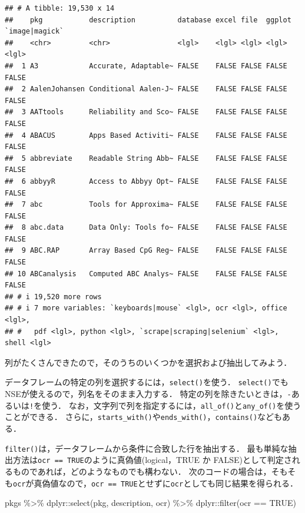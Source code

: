 \documentclass[
]{article}
\newenvironment{Shaded}{\begin{snugshade}}{\end{snugshade}}
\newcommand{\ConstantTok}[1]{\textcolor[rgb]{0.00,0.00,0.00}{#1}}
\newcommand{\FunctionTok}[1]{\textcolor[rgb]{0.00,0.00,0.00}{#1}}
\newcommand{\NormalTok}[1]{#1}
\newcommand{\SpecialCharTok}[1]{\textcolor[rgb]{0.00,0.00,0.00}{#1}}
\begin{document}
\begin{verbatim}
## # A tibble: 19,530 x 14
##    pkg           description          database excel file  ggplot `image|magick`
##    <chr>         <chr>                <lgl>    <lgl> <lgl> <lgl>  <lgl>         
##  1 A3            Accurate, Adaptable~ FALSE    FALSE FALSE FALSE  FALSE         
##  2 AalenJohansen Conditional Aalen-J~ FALSE    FALSE FALSE FALSE  FALSE         
##  3 AATtools      Reliability and Sco~ FALSE    FALSE FALSE FALSE  FALSE         
##  4 ABACUS        Apps Based Activiti~ FALSE    FALSE FALSE FALSE  FALSE         
##  5 abbreviate    Readable String Abb~ FALSE    FALSE FALSE FALSE  FALSE         
##  6 abbyyR        Access to Abbyy Opt~ FALSE    FALSE FALSE FALSE  FALSE         
##  7 abc           Tools for Approxima~ FALSE    FALSE FALSE FALSE  FALSE         
##  8 abc.data      Data Only: Tools fo~ FALSE    FALSE FALSE FALSE  FALSE         
##  9 ABC.RAP       Array Based CpG Reg~ FALSE    FALSE FALSE FALSE  FALSE         
## 10 ABCanalysis   Computed ABC Analys~ FALSE    FALSE FALSE FALSE  FALSE         
## # i 19,520 more rows
## # i 7 more variables: `keyboards|mouse` <lgl>, ocr <lgl>, office <lgl>,
## #   pdf <lgl>, python <lgl>, `scrape|scraping|selenium` <lgl>, shell <lgl>
\end{verbatim}

列がたくさんできたので，そのうちのいくつかを選択および抽出してみよう．

データフレームの特定の列を選択するには，\texttt{select()}を使う．
\texttt{select()}でもNSEが使えるので，列名をそのまま入力する．
特定の列を除きたいときは，\texttt{-}あるいは\texttt{!}を使う．
なお，文字列で列を指定するには，\texttt{all\_of()}と\texttt{any\_of()}を使うことができる．
さらに，\texttt{starts\_with()}や\texttt{ends\_with()}，\texttt{contains()}などもある．

\texttt{filter()}は，データフレームから条件に合致した行を抽出する．
最も単純な抽出方法は\texttt{ocr\ ==\ TRUE}のように真偽値(logical，TRUE か FALSE)として判定されるものであれば，どのようなものでも構わない．
次のコードの場合は，そもそも\texttt{ocr}が真偽値なので，\texttt{ocr\ ==\ TRUE}とせずに\texttt{ocr}としても同じ結果を得られる．

\begin{Shaded}
\begin{Highlighting}[]
\NormalTok{pkgs }\SpecialCharTok{\%\textgreater{}\%}
\NormalTok{  dplyr}\SpecialCharTok{::}\FunctionTok{select}\NormalTok{(pkg, description, ocr) }\SpecialCharTok{\%\textgreater{}\%}
\NormalTok{  dplyr}\SpecialCharTok{::}\FunctionTok{filter}\NormalTok{(ocr }\SpecialCharTok{==} \ConstantTok{TRUE}\NormalTok{)}
\end{Highlighting}
\end{Shaded}
\end{document}
